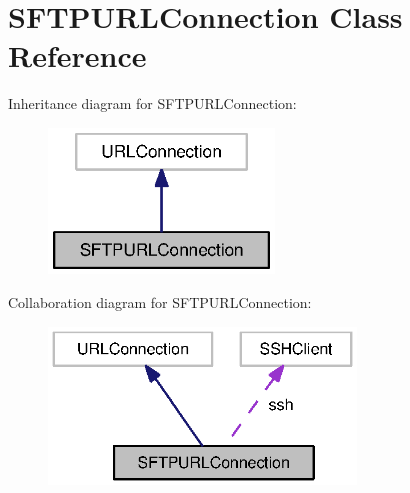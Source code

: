 \section{S\-F\-T\-P\-U\-R\-L\-Connection Class Reference}
\label{classorg_1_1smallfoot_1_1filexfer_1_1sftp_1_1SFTPURLConnection}


Inheritance diagram for S\-F\-T\-P\-U\-R\-L\-Connection\-:\nopagebreak
\begin{figure}[H]
\begin{center}
\leavevmode
\includegraphics[width=170pt]{classorg_1_1smallfoot_1_1filexfer_1_1sftp_1_1SFTPURLConnection__inherit__graph}
\end{center}
\end{figure}


Collaboration diagram for S\-F\-T\-P\-U\-R\-L\-Connection\-:\nopagebreak
\begin{figure}[H]
\begin{center}
\leavevmode
\includegraphics[width=232pt]{classorg_1_1smallfoot_1_1filexfer_1_1sftp_1_1SFTPURLConnection__coll__graph}
\end{center}
\end{figure}
